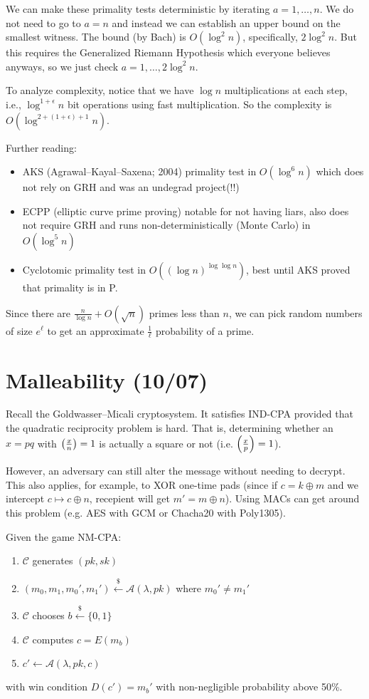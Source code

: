 \documentclass[notes]{agony}
\newcommand{\xgets}{\xleftarrow}
\newcommand{\ndgets}{\xgets{\mathdollar}}
\newcommand{\leg}[2]{\qty(\frac{#1}{#2})}
\begin{document}
We can make these primality tests deterministic by iterating $a = 1,\dotsc,n$.
We do not need to go to $a=n$ and instead
we can establish an upper bound on the smallest witness.
The bound (by Bach) is $O(\log^2 n)$, specifically, $2\log^2n$.
But this requires the Generalized Riemann Hypothesis
which everyone believes anyways, so we just check $a = 1,\dotsc,2\log^2 n$.

To analyze complexity, notice that we have $\log n$ multiplications at each step,
i.e., $\log^{1+\epsilon} n$ bit operations using fast multiplication.
So the complexity is $O(\log^{2 + (1 + \epsilon) + 1} n)$.

Further reading:
\begin{itemize}[nosep]
  \item AKS (Agrawal--Kayal--Saxena; 2004) primality test in $O(\log^6 n)$
        which does not rely on GRH and was an undegrad project(!!)
  \item ECPP (elliptic curve prime proving) notable for not having liars,
        also does not require GRH and runs non-deterministically (Monte Carlo)
        in $O(\log^5 n)$
  \item Cyclotomic primality test in $O((\log n)^{\log \log n})$,
        best until AKS proved that primality is in P.
\end{itemize}

Since there are $\frac{n}{\log n} + O(\sqrt n)$ primes less than $n$,
we can pick random numbers of size $e^\ell$ to get an approximate $\frac{1}{\ell}$
probability of a prime.

\section{Malleability (10/07)}
Recall the Goldwasser--Micali cryptosystem.
It satisfies IND-CPA provided that the quadratic reciprocity problem is hard.
That is, determining whether an $x = pq$ with $\leg{x}{n} = 1$
is actually a square or not (i.e. $\leg{x}{p} = 1$).

However, an adversary can still alter the message without needing to decrypt.
This also applies, for example, to XOR one-time pads (since if $c = k \oplus m$
and we intercept $c \mapsto c \oplus n$, recepient will get $m' = m \oplus n$).
Using MACs can get around this problem (e.g. AES with GCM or Chacha20 with Poly1305).

\begin{defn}
  Given the game NM-CPA:
  \begin{enumerate}[1.,nosep]
    \item $\mathcal C$ generates $(pk,sk)$
    \item $(m_0, m_1, m_0', m_1') \ndgets \mathcal A(\lambda, pk)$ where $m_0' \neq m_1'$
    \item $\mathcal C$ chooses $b \ndgets \{0,1\}$
    \item $\mathcal C$ computes $c = E(m_b)$
    \item $c' \gets \mathcal A(\lambda, pk, c)$
  \end{enumerate}
  with win condition $D(c') = m_b'$ with non-negligible probability above 50\%.
\end{defn}
\end{document}
